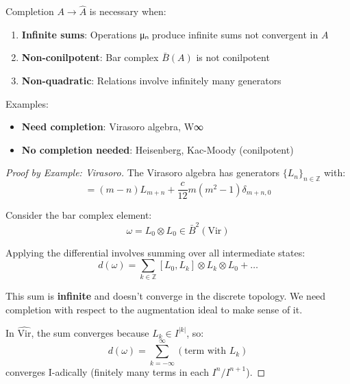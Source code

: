 \begin{theorem}
\label{thm:completion-necessity}
Completion $A \to \hat{A}$ is necessary when:
\begin{enumerate}
\item \textbf{Infinite sums}: Operations μₙ produce infinite sums not convergent in $A$
\item \textbf{Non-conilpotent}: Bar complex $\bar{B}(A)$ is not conilpotent
\item \textbf{Non-quadratic}: Relations involve infinitely many generators
\end{enumerate}

Examples:
\begin{itemize}
\item \textbf{Need completion}: Virasoro algebra, W∞
\item \textbf{No completion needed}: Heisenberg, Kac-Moody (conilpotent)
\end{itemize}
\end{theorem}

\begin{proof}[Proof by Example: Virasoro]
The Virasoro algebra has generators $\{L_n\}_{n \in \mathbb{Z}}$ with:
\begin{equation}
[L_m, L_n] = (m-n)L_{m+n} + \frac{c}{12}m(m^2-1)\delta_{m+n,0}
\end{equation}

Consider the bar complex element:
\begin{equation}
\omega = L_0 \otimes L_0 \in \bar{B}^2(\text{Vir})
\end{equation}

Applying the differential involves summing over all intermediate states:
\begin{equation}
d(\omega) = \sum_{k \in \mathbb{Z}} [L_0, L_k] \otimes L_k \otimes L_0 + \ldots
\end{equation}

This sum is \textbf{infinite} and doesn't converge in the discrete topology. We need 
completion with respect to the augmentation ideal to make sense of it.

In $\hat{\text{Vir}}$, the sum converges because $L_k \in I^{|k|}$, so:
\begin{equation}
d(\omega) = \sum_{k=-\infty}^\infty (\text{term with } L_k) 
\end{equation}
converges I-adically (finitely many terms in each $I^n/I^{n+1}$).
\end{proof}

